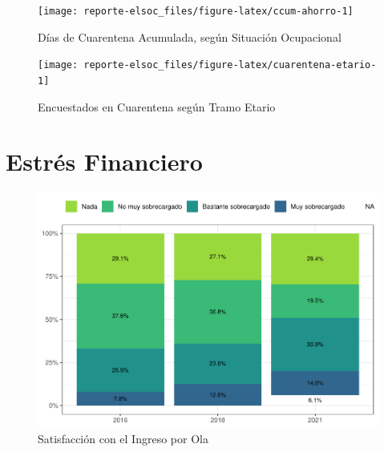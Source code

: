 \documentclass[
  12pt,
  openany]{book}
\begin{document}
\begin{figure}

{\centering \texttt{[image: reporte-elsoc\_files/figure-latex/ccum-ahorro-1]} 

}

\caption{Días de Cuarentena Acumulada, según Situación Ocupacional}\label{fig:ccum-ahorro}
\end{figure}

\begin{figure}

{\centering \texttt{[image: reporte-elsoc\_files/figure-latex/cuarentena-etario-1]} 

}

\caption{Encuestados en Cuarentena según Tramo Etario}\label{fig:cuarentena-etario}
\end{figure}

\hypertarget{estruxe9s-financiero}{%
\section{Estrés Financiero}\label{estruxe9s-financiero}}

\begin{figure}

{\centering \includegraphics{reporte-elsoc_files/figure-latex/satisfaccion-wave-1} 

}

\caption{Satisfacción con el Ingreso por Ola}\label{fig:satisfaccion-wave}
\end{figure}
\end{document}
